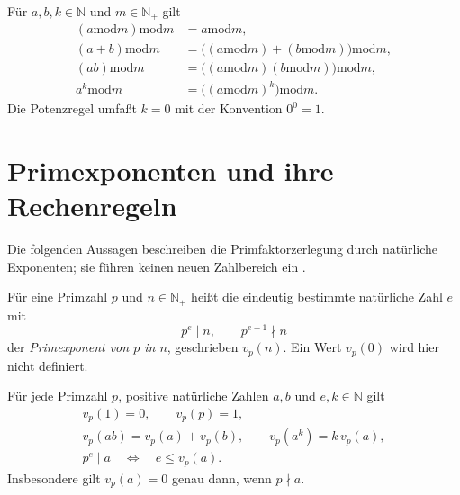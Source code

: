 \begin{theorem}
\label{b10guide:thm:remainder-rules}
Für $a,b,k\in\mathbb N$ und $m\in\mathbb N_+$ gilt
\[
 \begin{aligned}
 (a\mathbin{\mathrm{mod}}m)\mathbin{\mathrm{mod}}m
   &=a\mathbin{\mathrm{mod}}m,\\
 (a+b)\mathbin{\mathrm{mod}}m
   &=\bigl((a\mathbin{\mathrm{mod}}m)
          +(b\mathbin{\mathrm{mod}}m)\bigr)\mathbin{\mathrm{mod}}m,\\
 (ab)\mathbin{\mathrm{mod}}m
   &=\bigl((a\mathbin{\mathrm{mod}}m)
          (b\mathbin{\mathrm{mod}}m)\bigr)\mathbin{\mathrm{mod}}m,\\
 a^k\mathbin{\mathrm{mod}}m
   &=\bigl((a\mathbin{\mathrm{mod}}m)^k\bigr)\mathbin{\mathrm{mod}}m.
 \end{aligned}
\]
Die Potenzregel umfaßt $k=0$ mit der Konvention $0^0=1$.
\end{theorem}

\section{Primexponenten und ihre Rechenregeln}

Die folgenden Aussagen beschreiben die Primfaktorzerlegung durch
natürliche Exponenten; sie führen keinen neuen Zahlbereich ein
\cite{natvaluation}.

\begin{definition}
\label{b10guide:def:prime-exponent}
Für eine Primzahl $p$ und $n\in\mathbb N_+$ heißt die eindeutig
bestimmte natürliche Zahl $e$ mit
\[
 p^e\mid n,\qquad p^{e+1}\nmid n
\]
der \emph{Primexponent von $p$ in $n$}, geschrieben $v_p(n)$.
Ein Wert $v_p(0)$ wird hier nicht definiert.
\end{definition}

\begin{theorem}
\label{b10guide:thm:prime-exponent-laws}
Für jede Primzahl $p$, positive natürliche Zahlen $a,b$ und
$e,k\in\mathbb N$ gilt
\[
 \begin{gathered}
 v_p(1)=0,\qquad v_p(p)=1,\\
 v_p(ab)=v_p(a)+v_p(b),\qquad v_p(a^k)=k\,v_p(a),\\
 p^e\mid a\quad\Longleftrightarrow\quad e\le v_p(a).
 \end{gathered}
\]
Insbesondere gilt $v_p(a)=0$ genau dann, wenn $p\nmid a$.
\end{theorem}

